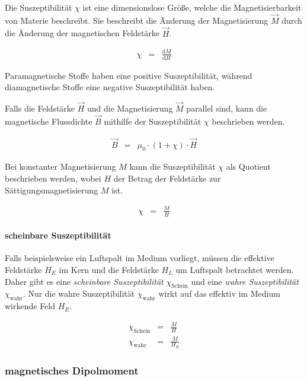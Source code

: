 \documentclass[12pt,a4paper]{scrartcl}
\numberwithin{equation}{section} %
\begin{document}
Die Suszeptibilität $\chi$ ist eine dimensionslose Größe, welche die
Magnetisierbarkeit von Materie beschreibt. Sie beschreibt die Änderung
der Magnetisierung $\vec M$ durch die Änderung der magnetischen
Feldstärke $\vec H$.

\begin{eqnarray}
    \chi &=& \frac{\mathrm dM}{\mathrm dH}
\end{eqnarray}

Paramagnetische Stoffe haben eine positive Suszeptibilität, während
diamagnetische Stoffe eine negative Suszeptibilität haben.

Falls die Feldstärke $\vec H$ und die Magnetisierung $\vec M$
parallel sind, kann die magnetische Flussdichte $\vec B$ mithilfe der
Suszeptibilität $\chi$ beschrieben werden.

\begin{eqnarray}
    \vec B &=& \mu_0\cdot (1+\chi) \cdot \vec H
\end{eqnarray}

Bei konstanter Magnetisierung $M$ kann die Suszeptibilität $\chi$
als Quotient beschrieben werden, wobei $H$ der Betrag der Feldstärke
zur Sättigungsmagnetisierung $M$ ist.

\begin{eqnarray}
    \chi &=& \frac{M}{H}
\end{eqnarray}

\hypertarget{scheinbare-suszeptibilituxe4t}{%
\paragraph{scheinbare
Suszeptibilität}\label{scheinbare-suszeptibilituxe4t}}

Falls beispielsweise ein Luftspalt im Medium vorliegt, müssen die
effektive Feldstärke $H_E$ im Kern und die Feldstärke $H_L$ um
Luftspalt betrachtet werden. Daher gibt es eine \emph{scheinbare
Suszeptibilität} $\chi_\mathrm{Schein}$ und eine \emph{wahre
Suszeptibilität} $\chi_\mathrm{wahr}$. Nur die wahre Suszeptibilität
$\chi_\mathrm{wahr}$ wirkt auf das effektiv im Medium wirkende Feld
$H_E$.

\begin{eqnarray}
    \chi_\mathrm{Schein} &=& \frac{M}{H} \\
    \chi_\mathrm{wahr} &=& \frac{M}{H_E}
\end{eqnarray}

\hypertarget{magnetisches-dipolmoment}{%
\subsubsection{magnetisches
Dipolmoment}\label{magnetisches-dipolmoment}}
\end{document}
